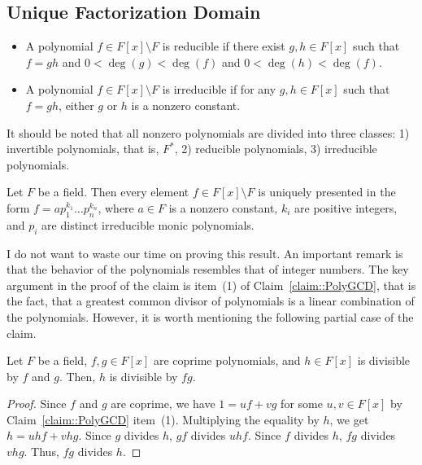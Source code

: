 \subsection{Unique Factorization Domain}

\begin{definition}
\begin{itemize}
\item A polynomial $ f\in F[x]\setminus F$ is reducible if there exist $g,h\in F[x]$ such that $f = gh$ and $0<\deg (g) < \deg (f)$ and $0 < \deg(h) < \deg(f)$.

\item A polynomial $ f\in F[x]\setminus F$ is irreducible if for any $g,h\in F[x]$ such that $f = gh$, either $g$ or $h$ is a nonzero constant.
\end{itemize}
\end{definition}

It should be noted that all nonzero polynomials are divided into three classes: 1) invertible polynomials, that is, $F^*$, 2) reducible polynomials, 3) irreducible polynomials.

\begin{claim}
[UFD]
\label{claim::PolyUFD}
Let $F$ be a field.
Then every element $f\in F[x]\setminus F$ is uniquely  presented in the form $f = a p_1^{k_1}\ldots p_n^{k_n}$, where $a\in F$ is a nonzero constant, $k_i$ are positive integers, and $p_i$ are distinct irreducible monic polynomials.
\end{claim}

I do not want to waste our time on proving this result.
An important remark is that the behavior of the polynomials resembles that of integer numbers.
The key argument in the proof of the claim is item~(1) of Claim~\ref{claim::PolyGCD}, that is the fact, that a greatest common divisor of polynomials is a linear combination of the polynomials.
However, it is worth mentioning the following partial case of the claim.

\begin{claim}
Let $F$ be a field, $f, g\in F[x]$ are coprime polynomials, and $h\in F[x]$ is divisible by $f$ and $g$.
Then, $h$ is divisible by $fg$.
\end{claim}
\begin{proof}
Since $f$ and $g$ are coprime, we have $1 = uf + vg$ for some $u,v\in F[x]$ by Claim~\ref{claim::PolyGCD} item~(1).
Multiplying the equality by $h$, we get $h = u hf + v hg$.
Since $g$  divides $h$, $gf$ divides $uhf$.
Since $f$ divides $h$, $fg$ divides $vhg$.
Thus, $fg$ divides $h$.
\end{proof}

